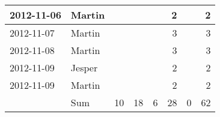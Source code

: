 \begin{table}[htbp]
\begin{tabular}{|l|l|r|r|r|r|r|r|}
    \hline
    2012-11-06 & Martin &       &       &       & 2     &       & 2 \bigstrut\\
    \hline
    2012-11-07 & Martin &       &       &       & 3     &       & 3 \bigstrut\\
    \hline
    2012-11-08 & Martin &       &       &       & 3     &       & 3 \bigstrut\\
    \hline
    2012-11-09 & Jesper &       &       &       & 2     &       & 2 \bigstrut\\
    \hline
    2012-11-09 & Martin &       &       &       & 2     &       & 2 \bigstrut\\
    \hline
          & Sum   & 10    & 18    & 6     & 28    & 0     & 62 \bigstrut\\
    \hline
    \end{tabular}%
  \label{tab:addlabel}%
\end{table}%

